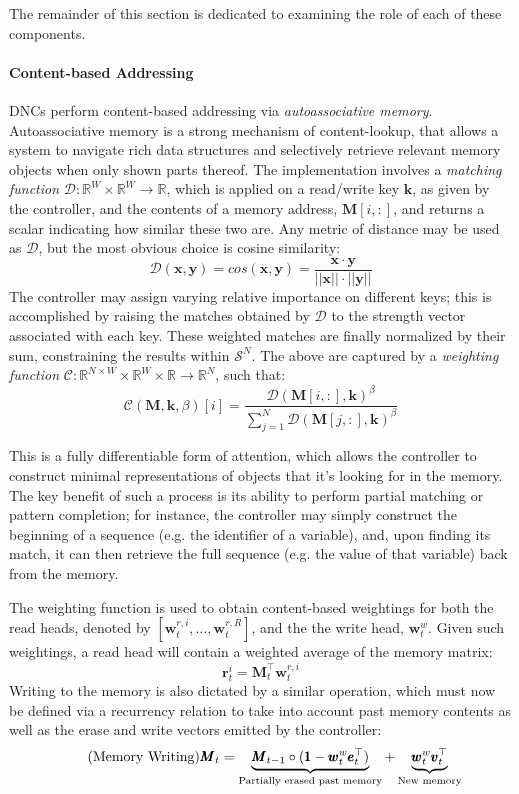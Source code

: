 \documentclass[]{article}
\begin{document}
The remainder of this section is dedicated to examining the role of each of these components.

\paragraph{Content-based Addressing} 
DNCs perform content-based addressing via \textit{autoassociative memory}. Autoassociative memory is a strong mechanism of content-lookup, that allows a system to navigate rich data structures and selectively retrieve relevant memory objects when only shown parts thereof. The implementation involves a \textit{matching function} $\mathcal{D}: \mathbb{R}^W \times \mathbb{R}^W \to \mathbb{R}$, which is applied on a read/write key $\pmb{k}$, as given by the controller, and the contents of a memory address, $\pmb{M}[i,:]$, and returns a scalar indicating how similar these two are. Any metric of distance may be used as $\mathcal{D}$, but the most obvious choice is cosine similarity:
 \[
 \tag{Cosine Similarity} \label{eqn:Cosine}
\mathcal{D}(\pmb{x}, \pmb{y}) = cos(\pmb{x},\pmb{y}) = \frac{\pmb{x} \cdot \pmb{y}}{||\pmb{x}|| \cdot ||\pmb{y}||}
\]
The controller may assign varying relative importance on different keys; this is accomplished by raising the matches obtained by $\mathcal{D}$ to the strength vector associated with each key. These weighted matches are finally normalized by their sum, constraining the results within $\mathcal{S}^N$. The above are captured by a \textit{weighting function} $\mathcal{C}: \mathbb{R}^{N \times W} \times \mathbb{R}^W \times \mathbb{R} \to \mathbb{R}^N$, such that:
\[
\tag{Weighting Function}
\mathcal{C}(\pmb{M},\pmb{k}, \beta)[i] = 
\frac{ \mathcal{D}(\pmb{M}[i,:],\pmb{k})^{\beta} }
{\sum\nolimits_{j=1}^N \mathcal{D}(\pmb{M}[j,:],\pmb{k})^{\beta}}
\]

This is a fully differentiable form of attention, which allows the controller to construct minimal representations of objects that it's looking for in the memory. The key benefit of such a process is its ability to perform partial matching or pattern completion; for instance, the controller may simply construct the beginning of a sequence (e.g. the identifier of a variable), and, upon finding its match, it can then retrieve the full sequence (e.g. the  value of that variable) back from the memory.

The weighting function is used to obtain content-based weightings for both the read heads, denoted by $[\pmb{w}_t^{r,i},\dots,\pmb{w}_t^{r,R}]$, and the the write head, $\pmb{w}_t^w$. Given such weightings, a read head will contain a weighted average of the memory matrix:
\[
\tag{Memory Reading}
\pmb{r}_t^i = \pmb{M}_t^{\top} \pmb{w}_t^{r,i} 
\]
Writing to the memory is also dictated by a similar operation, which must now be defined via a recurrency relation to take into account past memory contents as well as the erase and write vectors emitted by the controller:
\[
\tag{Memory Writing}
\pmb{M}_t = \underbrace{\pmb{M}_{t-1} \circ (\pmb{1} - \pmb{w}_t^w \pmb{e}_t^\top)}_{\text{\scriptsize Partially erased past memory}} + \underbrace{\pmb{w}_t^w \pmb{v}_t^\top}_{\text{\scriptsize New memory}}
\]
\end{document}
